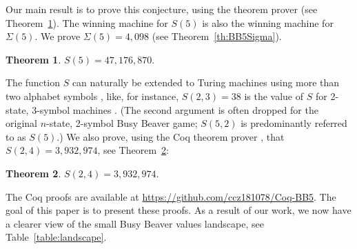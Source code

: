 \documentclass[a4paper,british]{article}
\theoremstyle{definition} %
\newtheorem{theorem}{Theorem}[section]
\numberwithin{equation}{section}
\theoremstyle{definition} %
\newcommand{\BBtheFifth}{47{,}176{,}870}
\newcommand{\SigmaTheFifth}{4{,}098}
\newcommand{\BBTxF}{3{,}932{,}974}
\begin{document}
Our main result is to prove this conjecture, using the \Coq theorem prover \cite{the_coq_development_team_2024_14542673} (see Theorem~\ref{th:BB5}). The winning machine for $S(5)$ is also the winning machine for $\Sigma(5)$. We prove $\Sigma(5) = \SigmaTheFifth$ (see Theorem~\ref{th:BB5Sigma}).

\begin{theorem}\label{th:BB5}
    $S(5) = \BBtheFifth$.
\end{theorem}

The function $S$ can naturally be extended to Turing machines using more than two alphabet symbols \cite{BradyMeaningOfLife}, like, for instance, $S(2,3) = 38$ is the value of $S$ for 2-state, 3-symbol machines \cite{BradyMeaningOfLife, MICHEL200445, LafittePapazian2007}. (The second argument is often dropped for the original $n$-state, 2-symbol Busy Beaver game; $S(5,2)$ is predominantly referred to as $S(5)$.) We also prove, using the Coq theorem prover \cite{the_coq_development_team_2024_14542673}, that $S(2,4) = \BBTxF$, see Theorem~\ref{th:BB24}:

\begin{theorem}\label{th:BB24}
    $S(2,4) = \BBTxF$.
\end{theorem}

The Coq proofs are available at \url{https://github.com/ccz181078/Coq-BB5}. The goal of this paper is to present these proofs. As a result of our work, we now have a clearer view of the small Busy Beaver values landscape, see Table~\ref{table:landscape}.
\end{document}
